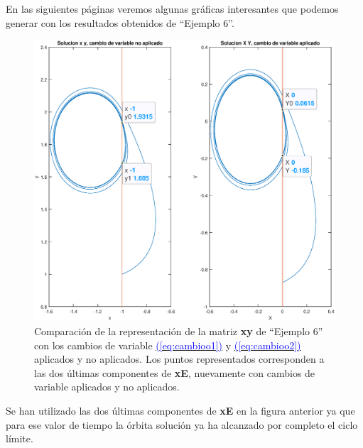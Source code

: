 \documentclass[12pt,a4paper]{report} %
\newcommand{\eref}[1]{\hyperref[#1]{\textcolor{blue}{(\ref*{#1})}}}
\begin{document}
    \vspace{1cm}En las siguientes páginas veremos algunas gráficas interesantes que podemos generar con los resultados obtenidos de ``Ejemplo 6''.
    
    \newpage
    
    	\begin{figure}[h]
    	\centering
    	\includegraphics[width=1.2\textwidth,center]{g1ejem6tiempo.eps}
    	\caption{Comparación de la representación de la matriz \textbf{xy} de ``Ejemplo 6'' con los cambios de variable \eref{eq:cambioo1} y \eref{eq:cambioo2} aplicados y no aplicados. Los puntos representados corresponden a las dos últimas componentes de \textbf{xE}, nuevamente con cambios de variable aplicados y no aplicados.}
    	\label{fig:g1ejem6}
    \end{figure}\smallskip
    
    \vspace{0.5cm}\noindent Se han utilizado las dos últimas componentes de \textbf{xE} en la figura anterior ya que para ese valor de tiempo la órbita solución ya ha alcanzado por completo el ciclo límite.
    
    \newpage
    
\end{document}
